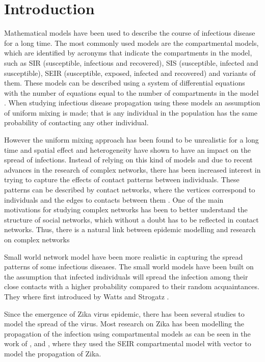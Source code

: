 \chapter{Introduction}
Mathematical models have been used to describe the course of infectious disease for a long time. The most commonly used
models are the compartmental models, which are identified by acronyms that indicate the compartments in the model, such as SIR (susceptible, infectious and recovered), SIS (susceptible, infected and susceptible),
SEIR  (susceptible, exposed, infected and recovered) and variants of them. These models can be described using a system of differential equations with the number of equations equal to the number of compartments in the model \citep{cheng2011small}.
When studying infectious disease propagation using these models an assumption of uniform mixing is made; that is any individual in the population has the same probability of contacting any other individual.
 
However the uniform mixing approach has been found to be unrealistic for a long time
and spatial effect and heterogeneity have shown to have an impact on the spread of infections. Instead of relying on this kind of models and due to recent advances in the research of complex networks, there has been increased interest in trying to capture the effects of contact patterns between individuals. These patterns can be described by contact networks, where the vertices correspond to individuals and the edges to contacts between them  \citep{wallinga1999perspective}. One of the main motivations for studying complex networks has been to better understand the structure of social networks, which without a doubt has to be reflected in contact networks. Thus, there is a natural link between epidemic modelling and research on complex networks \citep{kaski2005modeling}
 
Small world network  model have been more realistic in capturing the spread patterns of some infectious diseases. The small world models have been built on the assumption that infected individuals will spread the infection among their close contacts with a higher probability compared to their random acquaintances. They where first introduced by Watts and Strogatz \citep{watts1998collective}.
 
Since the emergence of Zika virus epidemic, there has been several studies to model the spread of the virus. Most research on Zika has been modelling the propagation of the infection
using compartmental models as can be seen in the work of \cite{1}, \cite{2} and \cite{3}, where they used the SEIR compartmental model with vector to model the propagation of Zika. 

